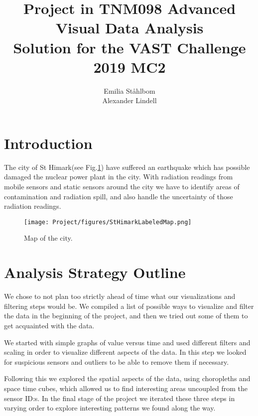 \documentclass[journal]{vgtc}                %
\title{Project in TNM098 Advanced Visual Data Analysis\\ Solution for the VAST Challenge 2019 MC2}
\author{Emilia Ståhlbom \\ Alexander Lindell
}
\begin{document}
\maketitle 

\section{Introduction}

The city of St Himark(see Fig.\ref{fig:sthimark}) have suffered an earthquake which has possible damaged the nuclear power plant in the city. With radiation readings from mobile sensors and static sensors around the city we have to identify areas of contamination and radiation spill, and also handle the uncertainty of those radiation readings. 

\begin{figure}[h!]
    \centering
    \texttt{[image: Project/figures/StHimarkLabeledMap.png]}
    \caption{Map of the city.}
      \label{fig:sthimark}
\end{figure}

\section{Analysis Strategy Outline }

We chose to not plan too strictly ahead of time what our visualizations and filtering steps would be. We compiled a list of possible ways to visualize and filter the data in the beginning of the project, and then we tried out some of them to get acquainted with the data. 

We started with simple graphs of value versus time and used different filters and scaling in order to visualize different aspects of the data. In this step we looked for suspicious sensors and outliers to be able to remove them if necessary. 

Following this we explored the spatial aspects of the data, using choropleths and space time cubes, which allowed us to find interesting areas uncoupled from the sensor ID:s. In the final stage of the project we iterated these three steps in varying order to explore interesting patterns we found along the way. 
\end{document}
